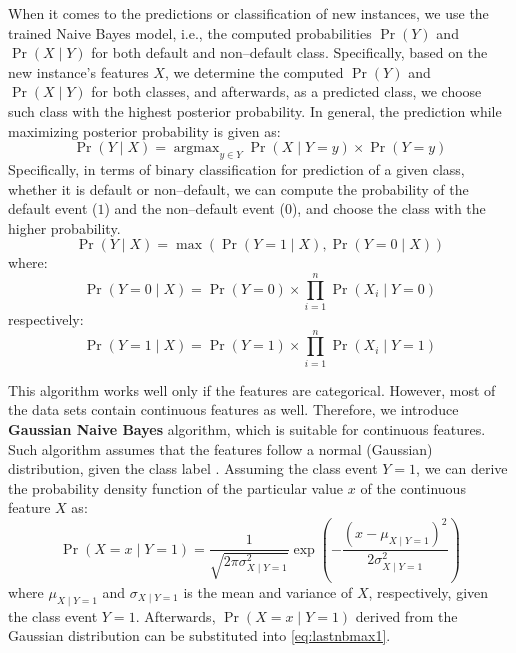 When it comes to the predictions or classification of new instances, we use the trained Naive Bayes model, i.e., the computed probabilities $\operatorname{Pr}\left(Y\right)$ and $ \operatorname{Pr}\left(X \mid Y \right)$ for both default and non--default class.
Specifically, based on the new instance's features $X$, we determine the computed $\operatorname{Pr}\left(Y\right)$ and $ \operatorname{Pr}\left(X \mid Y \right)$ for both classes, and afterwards, as a predicted class, we choose such class with the highest posterior probability. In general, the prediction while maximizing posterior probability is given as:
\begin{equation}\label{eq:nb-corrected}
    \operatorname{Pr}\left(Y \mid X \right) = \operatorname{argmax}_{y \in Y} \operatorname{Pr}\left(X \mid Y = y\right) \times \operatorname{Pr}(Y = y)
\end{equation}
Specifically, in terms of binary classification for prediction of a given class, whether it is default or non--default, we can compute the probability of the default event ($1$) and the non--default event ($0$), and choose the class with the higher probability.
\begin{equation}\label{eq}
    \operatorname{Pr}\left(Y \mid X \right)  = \max \left(\operatorname{Pr}\left(Y=1 \mid X\right), \operatorname{Pr}\left(Y=0 \mid X\right)\right)
\end{equation}
where:
\begin{equation}
    \operatorname{Pr}\left(Y=0 \mid X \right) = \operatorname{Pr}\left(Y=0\right) \times \prod_{i=1}^{n} \operatorname{Pr}\left(X_i \mid Y=0\right)
\end{equation}
respectively:
\begin{equation}\label{eq:lastnbmax1}
    \operatorname{Pr}\left(Y=1 \mid X \right) = \operatorname{Pr}\left(Y=1\right) \times \prod_{i=1}^{n} \operatorname{Pr}\left(X_i \mid Y=1\right)
\end{equation}

This algorithm works well only if the features are categorical.
However, most of the data sets contain continuous features as well.
Therefore, we introduce \textbf{Gaussian Naive Bayes} algorithm, which is suitable for continuous features. Such algorithm assumes that the features follow a normal (Gaussian) distribution, given the class label \citep{jahromi2017non}.
Assuming the class event $Y=1$, we can derive the probability density function of the particular value $x$ of the continuous feature $X$ as:
\begin{equation}\label{eq:lastgnb}
    \operatorname{Pr}\left(X = x \mid Y = 1\right) = \frac{1}{\sqrt{2 \pi \sigma_{X \mid Y=1}^{2}}} \exp \left(-\frac{\left(x - \mu_{X \mid Y=1}\right)^{2}}{2 \sigma_{X \mid Y=1}^{2}}\right)
\end{equation}
where $\mu_{X \mid Y=1}$ and $\sigma_{X \mid Y=1}$ is the mean and variance of $X$, respectively, given the class event $Y=1$.
Afterwards, $\operatorname{Pr}\left(X = x \mid Y = 1\right)$ derived from the Gaussian distribution can be substituted into \autoref{eq:lastnbmax1}.
